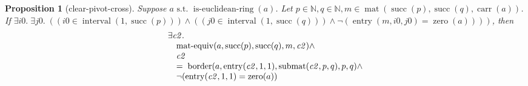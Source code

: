 \documentclass[11pt]{article}
\theoremstyle{plain}
\newtheorem{proposition}{Proposition}
\begin{document}
\begin{proposition}[clear-pivot-cross]
Suppose $a \text{ s.t. } \operatorname{is\text{-}euclidean\text{-}ring}(a)$. Let $p \in \mathbb{N}, q \in \mathbb{N}, m \in \operatorname{mat}(\operatorname{succ}(p), \operatorname{succ}(q), \operatorname{carr}(a))$. If $\exists \mathit{i0}.\; \exists \mathit{j0}.\; ((\mathit{i0} \in \operatorname{interval}(1, \operatorname{succ}(p))) \wedge ((\mathit{j0} \in \operatorname{interval}(1, \operatorname{succ}(q))) \wedge \neg (\operatorname{entry}(m, \mathit{i0}, \mathit{j0}) = \operatorname{zero}(a))))$, then 
\begin{equation*}
\begin{array}{@{}l@{}} \exists \mathit{c2}. \\ \quad \operatorname{mat\text{-}equiv}(a, \operatorname{succ}(p), \operatorname{succ}(q), m, \mathit{c2}) \wedge \\ \quad \mathit{c2} \\ \quad =\; \operatorname{border}(a, \operatorname{entry}(\mathit{c2}, 1, 1), \operatorname{submat}(\mathit{c2}, p, q), p, q) \wedge \\ \quad \neg (\operatorname{entry}(\mathit{c2}, 1, 1) = \operatorname{zero}(a)) \end{array}
\end{equation*}

\end{proposition}
\end{document}
